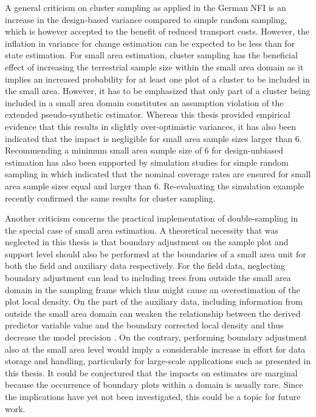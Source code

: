 A general criticism on cluster sampling as applied in the German NFI is an increase in the design-based variance compared to simple random sampling, which is however accepted to the benefit of reduced transport costs. However, the inflation in variance for change estimation can be expected to be less than for state estimation. For small area estimation, cluster sampling has the beneficial effect of increasing the terrestrial sample size within the small area domain as it implies an increased probability for at least one plot of a cluster to be included in the small area. However, it has to be emphasized that only part of a cluster being included in a small area domain constitutes an assumption violation of the extended pseudo-synthetic estimator. Whereas this thesis provided empirical evidence that this results in slightly over-optimistic variances, it has also been indicated that the impact is negligible for small area sample sizes larger than 6. Recommending a minimum small area sample size of 6 for design-unbiased estimation has also been supported by simulation studies for simple random sampling in \citet{mandallaz2013b} which indicated that the nominal coverage rates are ensured for small area sample sizes equal and larger than 6. Re-evaluating the simulation example recently confirmed the same results for cluster sampling.\par 

Another criticism concerns the practical implementation of double-sampling in the special case of small area estimation. A theoretical necessity that was neglected in this thesis is that boundary adjustment on the sample plot and support level should also be performed at the boundaries of a small area unit for both the field and auxiliary data respectively. For the field data, neglecting boundary adjustment can lead to including trees from outside the small area domain in the sampling frame which thus might cause an overestimation of the plot local density. On the part of the auxiliary data, including information from outside the small area domain can weaken the relationship between the derived predictor variable value and the boundary corrected local density and thus decrease the model precision \citep{mandallaz2013b}. On the contrary, performing boundary adjustment also at the small area level would imply a considerable increase in effort for data storage and handling, particularly for large-scale applications such as presented in this thesis. It could be conjectured that the impacts on estimates are marginal because the occurrence of boundary plots within a domain is usually rare. Since the implications have yet not been investigated, this could be a topic for future work.\par

